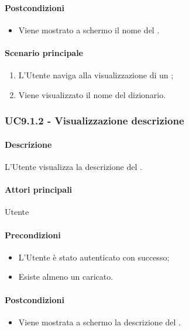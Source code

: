 \paragraph*{Postcondizioni}
\begin{itemize}
  \item Viene mostrato a schermo il nome del .
\end{itemize}
\paragraph*{Scenario principale}
\begin{enumerate}
  \item L’Utente naviga alla visualizzazione di un ;
  \item Viene visualizzato il nome del dizionario.  
\end{enumerate}


\subsubsection{UC9.1.2 - Visualizzazione descrizione }\label{UC9point1point2}
\paragraph*{Descrizione}
L’Utente visualizza la descrizione del .
\paragraph*{Attori principali} Utente
\paragraph*{Precondizioni}
\begin{itemize}
  \item L’Utente è stato autenticato con successo;
  \item Esiste almeno un  caricato.
\end{itemize}
\paragraph*{Postcondizioni}
\begin{itemize}
  \item Viene mostrata a schermo la descrizione del .
\end{itemize}

